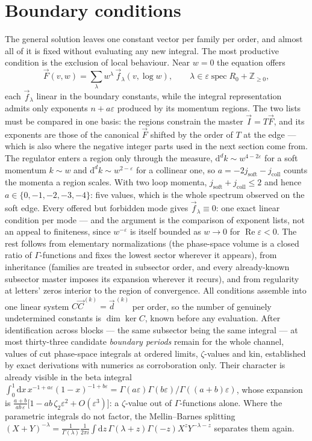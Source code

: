 \documentclass[11pt]{article}
\newcommand{\eps}{\varepsilon}
\newcommand{\dd}{\mathrm{d}}
\newcommand{\Z}{\mathbb{Z}}
\begin{document}
\section{Boundary conditions}
The general solution leaves one constant vector per family per
order, and almost all of it is fixed without evaluating any new
integral.  The most productive condition is the exclusion of local
behaviour.  Near $w = 0$ the equation offers
\begin{equation}
  \vec F(v,w) = \sum_\lambda w^{\lambda}\,
  \vec f_\lambda(v,\log w) ,
  \qquad
  \lambda \in \eps\operatorname{spec}R_0 + \Z_{\ge0} ,
\end{equation}
each $\vec f_\lambda$ linear in the boundary constants, while the
integral representation admits only exponents $n + a\eps$ produced by
its momentum regions.  The two lists must be compared in one basis:
the regions constrain the master $\vec I = T\vec F$, and its exponents
are those of the canonical $\vec F$ shifted by the order of $T$ at the
edge --- which is also where the negative integer parts used in the
next section come from.  The regulator enters a region only through the
measure, $\dd^dk \sim w^{4-2\eps}$ for a soft momentum $k \sim w$ and
$\dd^dk \sim w^{2-\eps}$ for a collinear one, so
$a = -2j_{\text{soft}} - j_{\text{coll}}$ counts the momenta a region
scales.  With two loop momenta,
$j_{\text{soft}} + j_{\text{coll}} \le 2$ and hence
$a \in \{0,-1,-2,-3,-4\}$: five values, which is the whole spectrum
observed on the soft edge.  Every offered but forbidden mode gives
$\vec f_\lambda \equiv 0$: one exact linear condition per mode ---
and the argument is the comparison of exponent lists, not an appeal
to finiteness, since $w^{-\eps}$ is itself bounded as $w\to0$ for
$\operatorname{Re}\eps<0$.  The rest follows from elementary
normalizations
(the phase-space volume is a closed ratio of $\Gamma$-functions and
fixes the lowest sector wherever it appears), from inheritance
(families are treated in subsector order, and every already-known
subsector master imposes its expansion wherever it recurs), and from
regularity at letters' zeros interior to the region of convergence.
All conditions assemble into one linear system $C\vec C^{(k)} =
\vec d^{\,(k)}$ per order, so the number of genuinely undetermined
constants is $\dim\ker C$, known before any evaluation.  After
identification across blocks --- the same subsector being the same
integral --- at most thirty-three candidate \emph{boundary periods}
remain for the whole channel, values of cut phase-space integrals at
ordered limits, $\zeta$-values and kin, established by exact
derivations with numerics as corroboration only.  Their character is
already visible in the beta integral
$\int_0^1\dd x\,x^{-1+a\eps}(1-x)^{-1+b\eps} =
\Gamma(a\eps)\Gamma(b\eps)/\Gamma((a+b)\eps)$, whose expansion is
$\frac{a+b}{ab\,\eps}\big[1 - ab\,\zeta_2\eps^2 + O(\eps^3)\big]$: a
$\zeta$-value out of $\Gamma$-functions alone.  Where the parametric
integrals do not factor, the Mellin--Barnes splitting
$(X+Y)^{-\lambda} = \frac{1}{\Gamma(\lambda)}\frac{1}{2\pi i}\int \dd
z\,\Gamma(\lambda+z)\Gamma(-z)X^z Y^{-\lambda-z}$ separates them
again.
\end{document}
